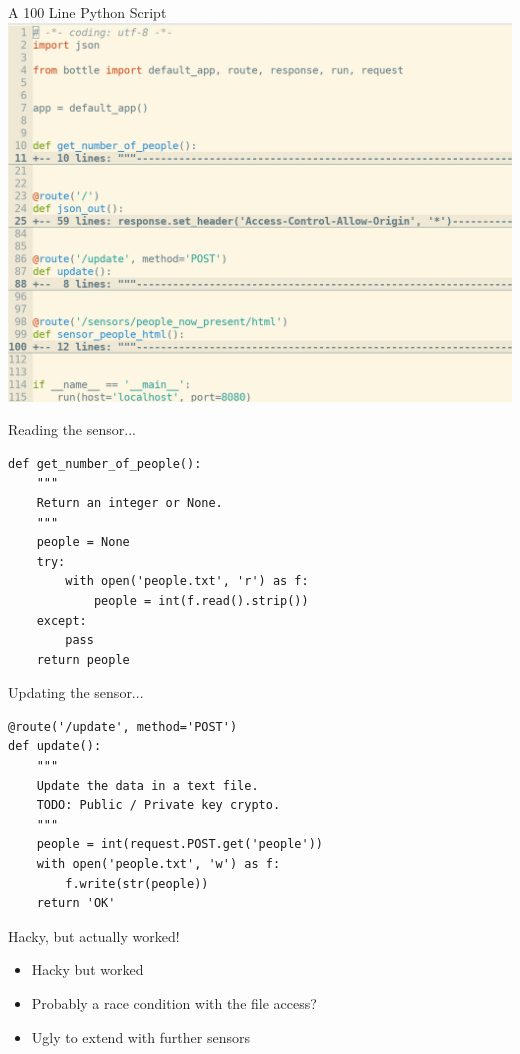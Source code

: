 \begin{frame}[c]{A 100 Line Python Script}
    \centering
    \includegraphics[height=0.98\textheight]{./spaceapi_in_rust/python2.png}
\end{frame}

\begin{frame}[fragile]{Reading the sensor...}
    \begin{verbatim}
def get_number_of_people():
    """
    Return an integer or None.
    """
    people = None
    try:
        with open('people.txt', 'r') as f:
            people = int(f.read().strip())
    except:
        pass
    return people
    \end{verbatim}
\end{frame}

\begin{frame}[fragile]{Updating the sensor...}
    \begin{verbatim}
@route('/update', method='POST')
def update():
    """
    Update the data in a text file.
    TODO: Public / Private key crypto.
    """
    people = int(request.POST.get('people'))
    with open('people.txt', 'w') as f:
        f.write(str(people))
    return 'OK'
    \end{verbatim}
\end{frame}

\begin{frame}[c]{Hacky, but actually worked!}
    \begin{itemize}
        \item Hacky but worked
        \item Probably a race condition with the file access?
        \item Ugly to extend with further sensors
    \end{itemize}
\end{frame}

